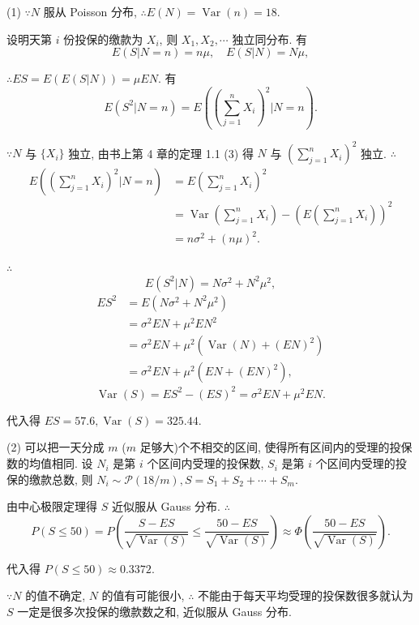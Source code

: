 \documentclass[color=black,device=normal,lang=cn]{elegantnote}
\numberwithin{equation}{section}
\theoremstyle{plain}
\numberwithin{exercise}{exsection}
\begin{document}
\begin{solution}
    (1) $\because N$ 服从 Poisson 分布, $\therefore E(N)=\operatorname{Var}(n)=18$.
    
    设明天第 $i$ 份投保的缴款为 $X_i$, 则 $X_1,X_2,\cdots$ 独立同分布. 有
    \[E(S|N=n)=n\mu,\quad E(S|N)=N\mu,\]
    
    $\therefore ES=E(E(S|N))=\mu EN$. 有
    \[E(S^2|N=n)=E\left(\left(\sum\limits_{j=1}^nX_i\right)^2\Bigg|N=n\right).\]

    $\because N$ 与 $\{X_i\}$ 独立, 由书上第 4 章的定理 1.1 (3) 得 $N$ 与 $\left(\sum\limits_{j=1}^nX_i\right)^2$ 独立. $\therefore$
    \begin{align*}
        E\left(\left(\sum\limits_{j=1}^nX_i\right)^2\Bigg|N=n\right) & =E\left(\sum\limits_{j=1}^nX_i\right)^2 \\
        & =\operatorname{Var}\left(\sum\limits_{j=1}^nX_i\right)-\left(E\left(\sum\limits_{j=1}^nX_i\right)\right)^2 \\
        & =n\sigma^2+(n\mu)^2.
    \end{align*}

    $\therefore$
    \[E(S^2|N)=N\sigma^2+N^2\mu^2,\]
    \begin{align*}
        ES^2 & =E(N\sigma^2+N^2\mu^2) \\
        & =\sigma^2EN+\mu^2EN^2 \\
        & =\sigma^2EN+\mu^2(\operatorname{Var}(N)+(EN)^2) \\
        & =\sigma^2EN+\mu^2(EN+(EN)^2),
    \end{align*}
    \[\operatorname{Var}(S)=ES^2-(ES)^2=\sigma^2EN+\mu^2EN.\]

    代入得 $ES=57.6,\operatorname{Var}(S)=325.44$.

    (2) 可以把一天分成 $m$ ($m$ 足够大)个不相交的区间, 使得所有区间内的受理的投保数的均值相同. 设 $N_i$ 是第 $i$ 个区间内受理的投保数, $S_i$ 是第 $i$ 个区间内受理的投保的缴款总数, 则 $N_i\sim\mathcal{P}(18/m),S=S_1+S_2+\cdots+S_m$.

    由中心极限定理得 $S$ 近似服从 Gauss 分布. $\therefore$
    \[P(S\leq50)=P\left(\dfrac{S-ES}{\sqrt{\operatorname{Var}(S)}}\leq\dfrac{50-ES}{\sqrt{\operatorname{Var}(S)}}\right)\approx\Phi\left(\dfrac{50-ES}{\sqrt{\operatorname{Var}(S)}}\right).\]

    代入得 $P(S\leq50)\approx0.3372$.
\end{solution}
\begin{note}
    $\because N$ 的值不确定, $N$ 的值有可能很小, $\therefore$ 不能由于每天平均受理的投保数很多就认为 $S$ 一定是很多次投保的缴款数之和, 近似服从 Gauss 分布.
\end{note}
\end{document}
